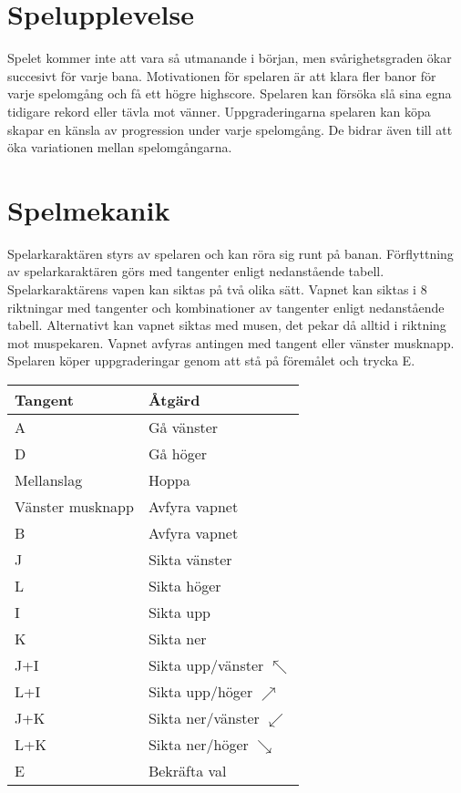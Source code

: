 \documentclass{TDP005mall}
\begin{document}
\section{Spelupplevelse}
Spelet kommer inte att vara så utmanande i början, men svårighetsgraden ökar succesivt för varje bana. Motivationen för spelaren är att klara fler banor för varje spelomgång och få ett högre highscore. Spelaren kan försöka slå sina egna tidigare rekord eller tävla mot vänner. 
Uppgraderingarna spelaren kan köpa skapar en känsla av progression under varje spelomgång. De bidrar även till att öka variationen mellan spelomgångarna. 

\newpage

\section{Spelmekanik}
Spelarkaraktären styrs av spelaren och kan röra sig runt på banan. Förflyttning av spelarkaraktären görs med tangenter enligt nedanstående tabell. Spelarkaraktärens vapen kan siktas på två olika sätt. Vapnet kan siktas i 8 riktningar med tangenter och kombinationer av tangenter enligt nedanstående tabell. Alternativt kan vapnet siktas med musen, det pekar då alltid i riktning mot muspekaren. Vapnet avfyras antingen med tangent eller vänster musknapp. Spelaren köper uppgraderingar genom att stå på föremålet och trycka E. 

\begin{table}[!h]
\begin{tabularx}{0.6\columnwidth}{|l|X|}
\hline
Tangent & Åtgärd \\\hline
A & Gå vänster \\\hline
D & Gå höger \\\hline
Mellanslag & Hoppa \\\hline
Vänster musknapp & Avfyra vapnet \\\hline
B & Avfyra vapnet \\\hline
J & Sikta vänster \\\hline
L & Sikta höger \\\hline
I & Sikta upp \\\hline
K & Sikta ner \\\hline
J+I & Sikta upp/vänster $\nwarrow$ \\\hline
L+I & Sikta upp/höger $\nearrow$ \\\hline
J+K & Sikta ner/vänster $\swarrow$ \\\hline
L+K & Sikta ner/höger $\searrow$ \\\hline
E & Bekräfta val \\\hline
\end{tabularx}
\end{table}
\end{document}
